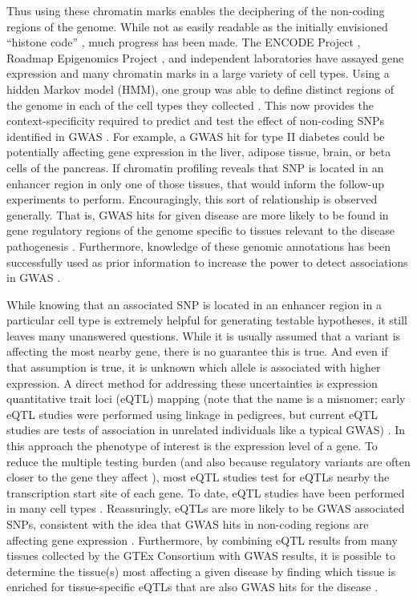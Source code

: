 Thus using these chromatin marks enables the deciphering of the
non-coding regions of the genome. While not as easily readable as the initially
envisioned “histone code” \citep{Jenuwein2001}, much progress has been
made. The ENCODE Project \citep{ENCODE2004, ENCODE2007, ENCODE2012, Ho2014, Kellis2014},
Roadmap Epigenomics Project \citep{Roadmap2015}, and independent laboratories
\citep{Mikkelsen2007} have assayed gene expression and many
chromatin marks in a large variety of cell types. Using a hidden
Markov model (HMM), one group was able to define distinct regions of the
genome in each of the cell types they collected \citep{Ernst2011}. This now provides the
context-specificity required to predict and test the effect of
non-coding SNPs identified in GWAS \citep{Trynka2013}. For example, a GWAS hit for type
II diabetes could be potentially affecting gene expression in the
liver, adipose tissue, brain, or beta cells of the pancreas. If
chromatin profiling reveals that SNP is located in an enhancer region
in only one of those tissues, that would inform the follow-up
experiments to perform. Encouragingly, this sort of relationship is
observed generally. That is, GWAS hits for given disease are more
likely to be found in gene regulatory regions of the genome specific
to tissues relevant to the disease pathogenesis \citep{Ernst2011, Trynka2013, Farh2015, Roadmap2015}. Furthermore,
knowledge of these genomic annotations has been successfully used as
prior information to increase the power to detect associations in
GWAS \citep{Pickrell2014, Wang2016}.

While knowing that an associated SNP is located in an enhancer region
in a particular cell type is extremely helpful for generating testable
hypotheses, it still leaves many unanswered questions. While it is
usually assumed that a variant is affecting the most nearby gene,
there is no guarantee this is true. And even if that assumption is
true, it is unknown which allele is associated with higher
expression. A direct method for addressing these uncertainties is
expression quantitative trait loci (eQTL) mapping (note that the name
is a misnomer; early eQTL studies were performed using linkage in
pedigrees, but current eQTL studies are tests of association in
unrelated individuals like a typical GWAS) \citep{Monks2004, Duan2008, Franke2009, Lappalainen2015, Pai2015}. In this approach the
phenotype of interest is the expression level of a gene. To reduce the
multiple testing burden (and also because regulatory variants are
often closer to the gene they affect \citep{Battle2014}), most eQTL studies test for
eQTLs nearby the transcription start site of each gene. To date, eQTL
studies have been performed in many cell types \citep{Nica2011, GTEx2015}. Reassuringly, eQTLs
are more likely to be GWAS associated SNPs, consistent with the idea
that GWAS hits in non-coding regions are affecting gene
expression \citep{Emilsson2008, Nica2010, Nicolae2010, Raj2013, GTEx2015}. Furthermore, by combining eQTL results from many tissues
collected by the GTEx Consortium \citep{GTEx2013} with GWAS results, it is possible to
determine the tissue(s) most affecting a given disease by finding
which tissue is enriched for tissue-specific eQTLs that are also GWAS
hits for the disease \citep{Ongen2016}.

